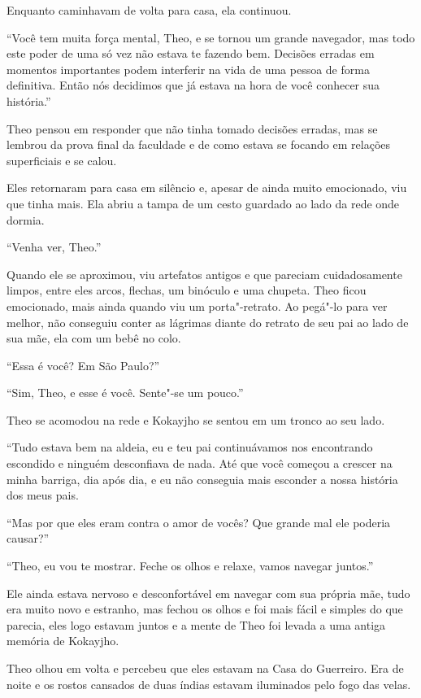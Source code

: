 Enquanto caminhavam de volta para casa, ela continuou.

``Você tem muita força mental, Theo, e se tornou um grande navegador,
mas todo este poder de uma só vez não estava te fazendo bem. Decisões
erradas em momentos importantes podem interferir na vida de uma pessoa
de forma definitiva. Então nós decidimos que já estava na hora de você
conhecer sua história.''

Theo pensou em responder que não tinha tomado decisões erradas, mas se
lembrou da prova final da faculdade e de como estava se focando em
relações superficiais e se calou.

Eles retornaram para casa em silêncio e, apesar de ainda muito
emocionado, viu que tinha mais. Ela abriu a tampa de um cesto guardado
ao lado da rede onde dormia.

``Venha ver, Theo.''

Quando ele se aproximou, viu artefatos antigos e que pareciam
cuidadosamente limpos, entre eles arcos, flechas, um binóculo e uma
chupeta. Theo ficou emocionado, mais ainda quando viu um porta"-retrato.
Ao pegá"-lo para ver melhor, não conseguiu conter as lágrimas diante do
retrato de seu pai ao lado de sua mãe, ela com um bebê no colo.

``Essa é você? Em São Paulo?''

``Sim, Theo, e esse é você. Sente"-se um pouco.''

Theo se acomodou na rede e Kokayjho se sentou em um tronco ao seu lado.

``Tudo estava bem na aldeia, eu e teu pai continuávamos nos encontrando
escondido e ninguém desconfiava de nada. Até que você começou a crescer
na minha barriga, dia após dia, e eu não conseguia mais esconder a nossa
história dos meus pais.

``Mas por que eles eram contra o amor de vocês? Que grande mal ele
poderia causar?''

``Theo, eu vou te mostrar. Feche os olhos e relaxe, vamos navegar
juntos.''

Ele ainda estava nervoso e desconfortável em navegar com sua própria
mãe, tudo era muito novo e estranho, mas fechou os olhos e foi mais
fácil e simples do que parecia, eles logo estavam juntos e a mente de
Theo foi levada a uma antiga memória de Kokayjho.

\asterisc


Theo olhou em volta e percebeu que eles estavam na Casa do Guerreiro.
Era de noite e os rostos cansados de duas índias estavam iluminados pelo
fogo das velas.

